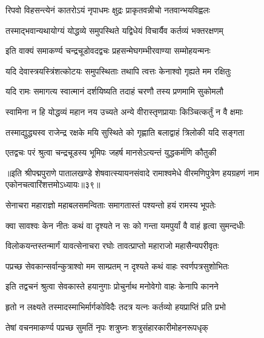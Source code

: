 \twolineshloka
{रिपवो विहसन्त्येनं कातरोऽयं नृपाधमः}
{क्षुद्रः प्राकृतवन्नीचो नतवान्भयविह्वलः}%

\twolineshloka
{तस्माद्भवान्यथायोग्यं योद्धव्ये समुपस्थिते}
{यद्विधेयं विचार्यैव कर्तव्यं भक्तरक्षणम्}%


\twolineshloka
{इति वाक्यं समाकर्ण्य चन्द्रचूडोवदद्वचः}
{प्रहसन्मेघगम्भीरवाण्या सम्मोहयन्मनः}%

\twolineshloka
{यदि देवास्त्रयस्त्रिंशत्कोटयः समुपस्थिताः}
{तथापि त्वत्तः केनाश्वो गृह्यते मम रक्षितुः}%

\twolineshloka
{यदि रामः समागत्य स्वात्मानं दर्शयिष्यति}
{तदाहं चरणौ तस्य प्रणमामि सुकोमलौ}%

\twolineshloka
{स्वामिना न हि योद्धव्यं महान नय उच्यते}
{अन्ये वीरास्तृणप्रायाः किञ्चित्कर्तुं न वै क्षमाः}%

\twolineshloka
{तस्माद्युद्ध्यस्व राजेन्द्र रक्षके मयि सुस्थिते}
{को गृह्णाति बलाद्वाहं त्रिलोकी यदि सङ्गता}%


\twolineshloka
{एतद्वचः परं श्रुत्वा चन्द्रचूडस्य भूमिपः}
{जहर्ष मानसेऽत्यन्तं युद्धकर्मणि कौतुकी}%

॥इति श्रीपद्मपुराणे पातालखण्डे शेषवात्स्यायनसंवादे रामाश्वमेधे वीरमणिपुत्रेण हयग्रहणं नाम एकोनचत्वारिंशत्तमोऽध्यायः॥३९॥



\twolineshloka
{सेनाचरा महाराज्ञो महाबलसमन्विताः}
{समागतास्तं पश्यन्तो हयं रामस्य भूपतेः}%

\twolineshloka
{क्वा सावश्वः केन नीतः कथं वा दृश्यते न सः}
{को गन्ता यमपुर्यां वै वाहं हृत्वा सुमन्दधीः}%

\twolineshloka
{विलोकयन्तस्तन्मार्गं यावत्सेनाचरा रघोः}
{तावत्प्राप्तो महाराजो महासैन्यपरीवृतः}%

\twolineshloka
{पप्रच्छ सेवकान्सर्वान्कुत्राश्वो मम साम्प्रतम्}
{न दृश्यते कथं वाहः स्वर्णपत्रसुशोभितः}%

\twolineshloka
{इति तद्वचनं श्रुत्वा सेवकास्ते हयानुगाः}
{प्रोचुर्नाथ मनोवेगो वाहः केनापि कानने}%

\twolineshloka
{हृतो न लक्ष्यते तस्मादस्माभिर्मार्गकोविदैः}
{तदत्र यत्नः कर्तव्यो हयप्राप्तिं प्रति प्रभो}%

\twolineshloka
{तेषां वचनमाकर्ण्य पप्रच्छ सुमतिं नृपः}
{शत्रुघ्नः शत्रुसंहारकारीमोहनरूपधृक्}%



